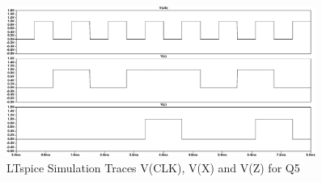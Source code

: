 \begin{figure}[!ht]
    \centering
    \includegraphics[width=0.9\textwidth]{inc/Q/Q5/Q5.pdf}
    \caption{LTspice Simulation Traces V(CLK), V(X) and V(Z) for Q5}\label{fig:Q5}
    \end{figure}\FloatBarrier 
    